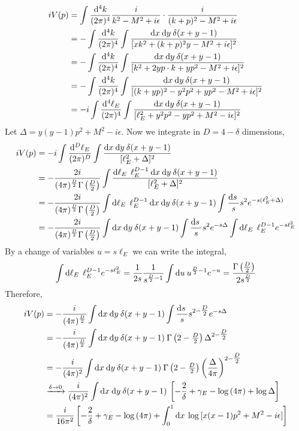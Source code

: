 \documentclass[12pt]{article}
\begin{document}
\begin{align*}
i V(p) & = \int \frac{\mathrm{d}^4 k}{(2\pi)^4} \frac{i}{k^2 - M^2 + i \epsilon} \cdot \frac{i}{(k + p)^2 - M^2 + i \epsilon} 
\\
& = - \int \frac{\mathrm{d}^4 k}{(2\pi)^4} \int \frac{ \mathrm{d}x \: \mathrm{d}y \: \delta(x + y - 1)}{[x k^2 + (k + p)^2 y - M^2 + i \epsilon]^2} 
\\
& = - \int \frac{\mathrm{d}^4 k}{(2\pi)^4} \int \frac{ \mathrm{d}x \: \mathrm{d}y \: \delta(x + y - 1)}{[k^2 + 2y  p \cdot k + y p^2 - M^2 + i \epsilon]^2} 
\\
& = - \int \frac{\mathrm{d}^4 k}{(2\pi)^4} \int \frac{ \mathrm{d}x \: \mathrm{d}y \: \delta(x + y - 1)}{[(k + yp)^2 - y^2 p^2 + y p^2 - M^2 + i \epsilon]^2} 
\\
& = -i \int \frac{\mathrm{d}^4 \ell_E}{(2\pi)^4} \int \frac{ \mathrm{d}x \: \mathrm{d}y \: \delta(x + y - 1)}{[\ell_E^2 + y^2 p^2 - y p^2 + M^2 - i \epsilon]^2} 
\end{align*}
Let $\Delta = y(y - 1) p^2 + M^2 - i \epsilon$. Now we integrate in $D = 4 - \delta$ dimensions,
\begin{align*}
i V(p) &= -i \int \frac{\mathrm{d}^D \ell_E}{(2\pi)^D} \int \frac{ \mathrm{d}x \: \mathrm{d}y \: \delta(x + y - 1)}{[\ell_E^2 + \Delta]^2} 
\\
& = -\frac{2i}{(4 \pi)^{\frac{D}{2}} \Gamma\left(\frac{D}{2}\right)} \int \frac{ \mathrm{d}\ell_E \: \: \ell_E^{D - 1} \: \mathrm{d}x \: \mathrm{d}y \: \delta(x + y - 1)}{[\ell_E^2 + \Delta]^2} 
\\
& = -\frac{2i}{(4 \pi)^{\frac{D}{2}} \Gamma\left(\frac{D}{2}\right)} \int \mathrm{d}\ell_E \: \: \ell_E^{D - 1} \: \mathrm{d}x \: \mathrm{d}y \: \delta(x + y - 1) \int \frac{\mathrm{d}s \:}{s} s^2 e^{-s(\ell_E^2 + \Delta)} 
\\
& = -\frac{2i}{(4 \pi)^{\frac{D}{2}} \Gamma\left(\frac{D}{2}\right)} \int \mathrm{d}x \: \mathrm{d}y \: \delta(x + y - 1) \int \frac{\mathrm{d}s \:}{s} s^2 e^{-s \Delta} \int \mathrm{d}\ell_E \: \: \ell_E^{D - 1} e^{-s \ell_E^2} 
\end{align*}
By a change of variables $u = s \ell_E$ we can write the integral,
\[ \int \mathrm{d}\ell_E \: \: \ell_E^{D - 1} e^{-s \ell_E^2}  = \frac{1}{2 s} \frac{1}{s^{\frac{D}{2} - 1}} \int \mathrm{d}u \: u^{\frac{D}{2} - 1} e^{-u} = \frac{\Gamma\left(\tfrac{D}{2}\right)}{2 s^{\frac{D}{2}}}  \]
Therefore,
\begin{align*}
i V(p) & = -\frac{i}{(4 \pi)^{\frac{D}{2}}} \int \mathrm{d}x \: \mathrm{d}y \: \delta(x + y - 1) \int \frac{\mathrm{d}s \:}{s} s^{2 - \tfrac{D}{2}} e^{-s \Delta} 
\\
& = -\frac{i}{(4 \pi)^{\frac{D}{2}}} \int \mathrm{d}x \: \mathrm{d}y \: \delta(x + y - 1) \: \Gamma\left(2 - \tfrac{D}{2}\right) \Delta^{2 - \tfrac{D}{2}}
\\
& = -\frac{i}{(4 \pi)^2} \int \mathrm{d}x \: \mathrm{d}y \: \delta(x + y - 1) \: \Gamma\left(2 - \tfrac{D}{2}\right) \left( \frac{\Delta}{4 \pi} \right)^{2 - \tfrac{D}{2}}
\\
& \xrightarrow{\delta \to 0} 
\frac{i}{(4 \pi)^2} \int \mathrm{d}x \: \mathrm{d}y \: \delta(x + y - 1) \: \left[ - \frac{2}{\delta} + \gamma_E  - \log{(4 \pi)} + \log{\Delta} \right]
\\
& = \frac{i}{16 \pi^2} \left[ - \frac{2}{\delta} + \gamma_E - \log{(4 \pi)} + \int_0^1 \mathrm{d}x \: \log{[x(x-1) p^2 + M^2 - i \epsilon]} \right]
\end{align*}
\end{document}
